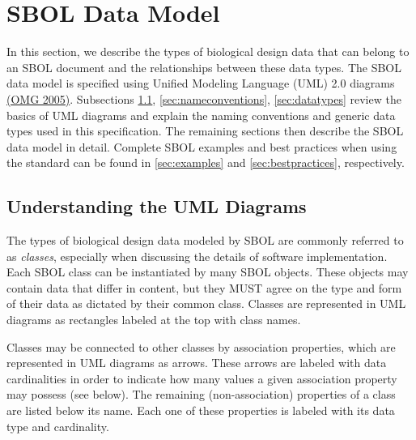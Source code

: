 \section{SBOL Data Model}


In this section, we describe the types of biological design data that can belong to an SBOL document and the relationships between these data types. The SBOL data model is specified using Unified Modeling Language (UML) 2.0 diagrams \href{http://www.omg.org/spec/UML/2.0/}{(OMG 2005)}. Subsections \ref{sec:umldiagrams}, \ref{sec:nameconventions}, \ref{sec:datatypes} review the basics of UML diagrams and explain the naming conventions and generic data types used in this specification. The remaining sections then describe the SBOL data model in detail. Complete SBOL examples and best practices when using the standard can be found in \ref{sec:examples} and \ref{sec:bestpractices}, respectively. 

\subsection{Understanding the UML Diagrams}
\label{sec:umldiagrams}

The types of biological design data modeled by SBOL are commonly referred to as {\em classes}, especially when discussing the details of software implementation. Each SBOL class can be instantiated by many SBOL objects. These objects may contain data that differ in content, but they MUST agree on the type and form of their data as dictated by their common class. Classes are represented in UML diagrams as rectangles labeled at the top with class names.

Classes may be connected to other classes by association properties, which are represented in UML diagrams as arrows. These arrows are labeled with data cardinalities in order to indicate how many values a given association property may possess (see below). The remaining (non-association) properties of a class are listed below its name. Each one of these properties is labeled with its data type and cardinality.

